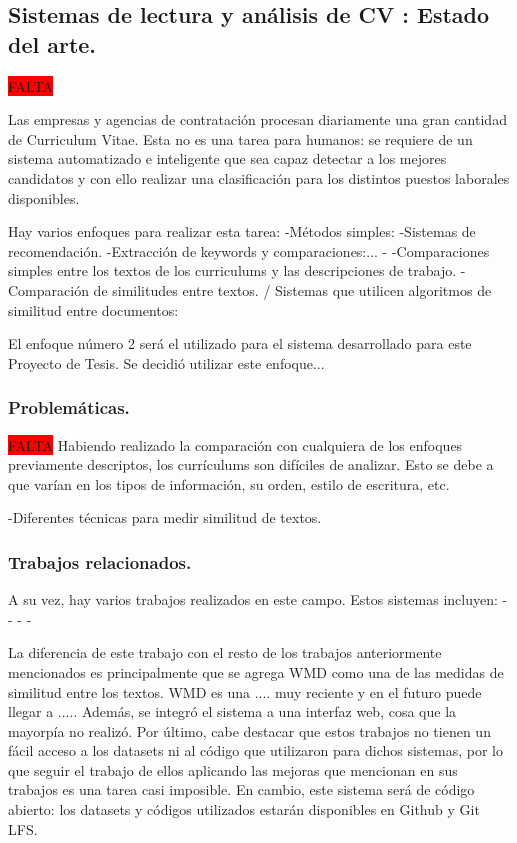 \documentclass[12pt,a4paper]{article}
\begin{document}
\subsection{Sistemas de lectura y análisis de CV : Estado del arte.}
\colorbox{red}{FALTA}

Las empresas y agencias de contratación procesan diariamente una gran cantidad de Curriculum Vitae. Esta no es una tarea para humanos: se requiere de un sistema automatizado e inteligente que sea capaz detectar a los mejores candidatos y con ello realizar una clasificación para los distintos puestos laborales disponibles.

Hay varios enfoques para realizar esta tarea:
	-Métodos simples: 
	-Sistemas de recomendación.
    -Extracción de keywords y comparaciones:...
    -
    -Comparaciones simples entre los textos de los curriculums y las descripciones de trabajo.
    -Comparación de similitudes entre textos. / Sistemas que utilicen algoritmos de similitud entre documentos:
    
El enfoque número 2 será el utilizado para el sistema desarrollado para este Proyecto de Tesis.
Se decidió utilizar este enfoque...

\cleardoublepage

\subsubsection{Problemáticas.}

\colorbox{red}{FALTA}
Habiendo realizado la comparación con cualquiera de los enfoques previamente descriptos, los currículums son difíciles de analizar. Esto se debe a que varían en los tipos de información, su orden, estilo de escritura, etc.

-Diferentes técnicas para medir similitud de textos. 

\subsubsection{Trabajos relacionados.}

A su vez, hay varios trabajos realizados en este campo. Estos sistemas incluyen:
-
-
-
-

La diferencia de este trabajo con el resto de los trabajos anteriormente mencionados es principalmente que se agrega WMD como una de las medidas de similitud entre los textos. WMD es una .... muy reciente y en el futuro puede llegar a .....
Además, se integró el sistema a una interfaz web, cosa que la mayorpía no realizó.
Por último, cabe destacar que estos trabajos no tienen un fácil acceso a los datasets ni al código que utilizaron para dichos sistemas, por lo que seguir el trabajo de ellos aplicando las mejoras que mencionan en sus trabajos es una tarea casi imposible. En cambio, este sistema será de código abierto:  los datasets y códigos utilizados estarán disponibles en Github y Git LFS.
\end{document}
